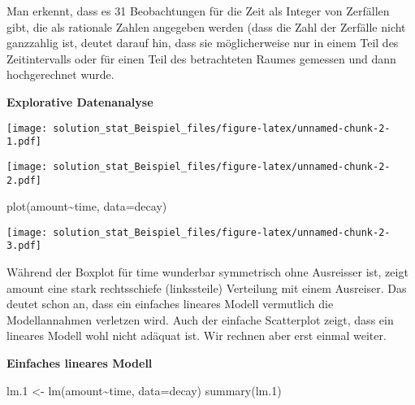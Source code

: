 \documentclass[
]{article}
\newenvironment{Shaded}{\begin{snugshade}}{\end{snugshade}}
\newcommand{\AttributeTok}[1]{\textcolor[rgb]{0.77,0.63,0.00}{#1}}
\newcommand{\FloatTok}[1]{\textcolor[rgb]{0.00,0.00,0.81}{#1}}
\newcommand{\FunctionTok}[1]{\textcolor[rgb]{0.00,0.00,0.00}{#1}}
\newcommand{\NormalTok}[1]{#1}
\newcommand{\OtherTok}[1]{\textcolor[rgb]{0.56,0.35,0.01}{#1}}
\newcommand{\SpecialCharTok}[1]{\textcolor[rgb]{0.00,0.00,0.00}{#1}}
\begin{document}
Man erkennt, dass es 31 Beobachtungen für die Zeit als Integer von
Zerfällen gibt, die als rationale Zahlen angegeben werden (dass die Zahl
der Zerfälle nicht ganzzahlig ist, deutet darauf hin, dass sie
möglicherweise nur in einem Teil des Zeitintervalls oder für einen Teil
des betrachteten Raumes gemessen und dann hochgerechnet wurde.

\textbf{Explorative Datenanalyse}

\begin{Shaded}
\end{Shaded}

\texttt{[image: solution\_stat\_Beispiel\_files/figure-latex/unnamed-chunk-2-1.pdf]}

\begin{Shaded}
\end{Shaded}

\texttt{[image: solution\_stat\_Beispiel\_files/figure-latex/unnamed-chunk-2-2.pdf]}

\begin{Shaded}
\begin{Highlighting}[]
\FunctionTok{plot}\NormalTok{(amount}\SpecialCharTok{\textasciitilde{}}\NormalTok{time, }\AttributeTok{data=}\NormalTok{decay)}
\end{Highlighting}
\end{Shaded}

\texttt{[image: solution\_stat\_Beispiel\_files/figure-latex/unnamed-chunk-2-3.pdf]}

Während der Boxplot für time wunderbar symmetrisch ohne Ausreisser ist,
zeigt amount eine stark rechtsschiefe (linkssteile) Verteilung mit einem
Ausreiser. Das deutet schon an, dass ein einfaches lineares Modell
vermutlich die Modellannahmen verletzen wird. Auch der einfache
Scatterplot zeigt, dass ein lineares Modell wohl nicht adäquat ist. Wir
rechnen aber erst einmal weiter.

\textbf{Einfaches lineares Modell}

\begin{Shaded}
\begin{Highlighting}[]
\NormalTok{lm}\FloatTok{.1} \OtherTok{\textless{}{-}} \FunctionTok{lm}\NormalTok{(amount}\SpecialCharTok{\textasciitilde{}}\NormalTok{time, }\AttributeTok{data=}\NormalTok{decay)}
\FunctionTok{summary}\NormalTok{(lm}\FloatTok{.1}\NormalTok{)}
\end{Highlighting}
\end{Shaded}
\end{document}
